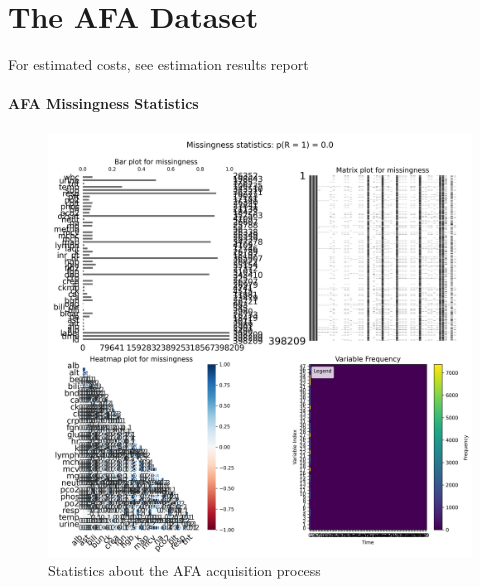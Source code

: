 \usepackage{longtable}\section{The AFA Dataset}
For estimated costs, see estimation results report\paragraph{AFA Missingness Statistics}
\begin{figure}\centering\includegraphics[width=0.5 \textwidth]{img/blocking_missingness_stats.png}\caption{Statistics about the AFA acquisition process}\label{fig:img/blocking_missingness_stats.png}\end{figure}